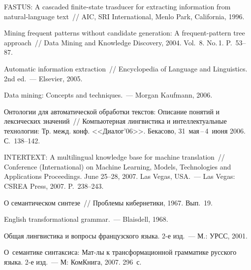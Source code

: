 \begin{multicols}{2}
{{\begin{thebibliography}{99}
     FASTUS: A cascaded finite-state trasducer for extracting information from 
natural-language text~// AIC, SRI International, Menlo Park, California, 1996. 
     
     Mining frequent patterns without candidate generation: A frequent-pattern 
tree approach~// Data Mining and Knowledge Discovery, 2004. Vol.~8. No.\,1. 
P.~53--87.
     
     
     Automatic information extraction~// Encyclopedia of Language and 
Linguistics. 2nd ed.~--- Elsevier, 2005.
     
     Data mining: Concepts and techniques.~--- Morgan Kaufmann, 2006.
     
     
     Онтологии для автоматической обработки текстов: Описание понятий 
и лексических значений~// Компьютерная лингвистика и интеллектуальные 
технологии: Тр. межд. конф. <<Диалог'06>>. Бекасово, 31~мая\,--\,4~июня 
2006. С.~138--142.

     INTERTEXT: A multilingual knowledge base for machine translation~// 
Conference (International) on Machine Learning, Models, Technologies and 
Applications Proceedings. June 25--28, 2007. Las Vegas, USA.~--- Las Vegas: 
CSREA Press, 2007. P.~238--243.

     О семантическом синтезе~// Проблемы кибернетики, 1967. Вып.~19.
     
         
     English transformational grammar.~--- Blaisdell, 1968.
     

\label{end\stat}
     
     Общая лингвистика и вопросы французского языка. 2-е изд.~--- М.: 
УРСС, 2001.

     О~семантике синтаксиса: Мат-лы к трансформационной 
грамматике русского языка. 2-е изд.~--- М: КомКнига, 2007.  296~с. 
     
 \end{thebibliography}
}
}


\end{multicols}
